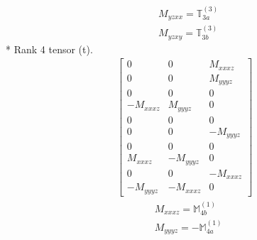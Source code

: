 \documentclass[fleqn,8pt,landscape]{jsarticle}
\begin{document}
\begin{align*}
& M_{yzxx} = \mathbb{T}_{3a}^{(3)} \\
& M_{yzxy} = \mathbb{T}_{3b}^{(3)}
\end{align*}
* Rank 4 tensor (t).
\begin{align*}
\begin{bmatrix} 0 & 0 & M_{xxxz} \\ 0 & 0 & M_{yyyz} \\ 0 & 0 & 0 \\ - M_{xxxz} & M_{yyyz} & 0 \\ 0 & 0 & 0 \\ 0 & 0 & - M_{yyyz} \\ 0 & 0 & 0 \\ M_{xxxz} & - M_{yyyz} & 0 \\ 0 & 0 & - M_{xxxz} \\ - M_{yyyz} & - M_{xxxz} & 0 \end{bmatrix}
\end{align*}
\begin{align*}
& M_{xxxz} = \mathbb{M}_{4b}^{(1)} \\
& M_{yyyz} = - \mathbb{M}_{4a}^{(1)}
\end{align*}
\end{document}

